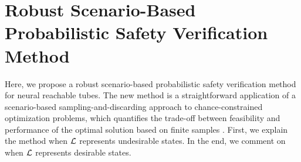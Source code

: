 \section{Robust Scenario-Based Probabilistic Safety Verification Method}\label{sec:scenario-based_method}
\vspace{-0.5em}
Here, we propose a robust scenario-based probabilistic safety verification method for neural reachable tubes.
The new method is a straightforward application of a scenario-based sampling-and-discarding approach to chance-constrained optimization problems, which quantifies the trade-off between feasibility and performance of the optimal solution based on finite samples \citep{campi2011sampling}.
First, we explain the method when $\mathcal{L}$ represents undesirable states. In the end, we comment on when $\mathcal{L}$ represents desirable states. 

